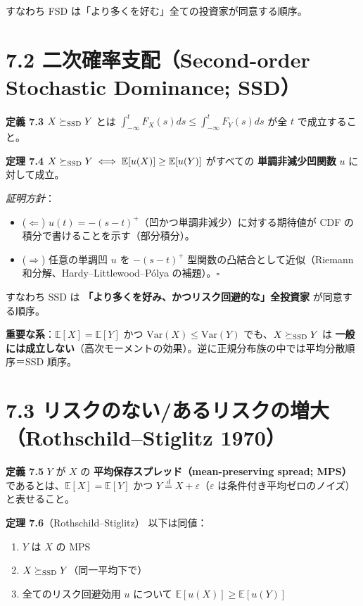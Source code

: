 \documentclass[11pt,a4paper]{report}
\begin{document}
すなわち FSD は「より多くを好む」全ての投資家が同意する順序。

\section{7.2 二次確率支配（Second-order Stochastic Dominance; SSD）}

\textbf{定義 7.3} $X \succeq_{\rm SSD} Y$ とは $\int_{-\infty}^t F_X(s) ds \le \int_{-\infty}^t F_Y(s) ds$ が全 $t$ で成立すること。

\textbf{定理 7.4} $X \succeq_{\rm SSD} Y \iff \mathbb{E}[u(X)] \ge \mathbb{E}[u(Y)]$ がすべての \textbf{単調非減少凹関数} $u$ に対して成立。

\emph{証明方針}：
\begin{itemize}
\item ($\Leftarrow$) $u(t) = -(s - t)^+$（凹かつ単調非減少）に対する期待値が CDF の積分で書けることを示す（部分積分）。
\item ($\Rightarrow$) 任意の単調凹 $u$ を $-(s-t)^+$ 型関数の凸結合として近似（Riemann 和分解、Hardy–Littlewood–Pólya の補題）。$\square$
\end{itemize}

すなわち SSD は \textbf{「より多くを好み、かつリスク回避的な」全投資家} が同意する順序。

\textbf{重要な系}：$\mathbb{E}[X] = \mathbb{E}[Y]$ かつ $\mathrm{Var}(X) \le \mathrm{Var}(Y)$ でも、$X \succeq_{\rm SSD} Y$ は \textbf{一般には成立しない}（高次モーメントの効果）。逆に正規分布族の中では平均分散順序＝SSD 順序。

\section{7.3 リスクのない/あるリスクの増大（Rothschild–Stiglitz 1970）}

\textbf{定義 7.5} $Y$ が $X$ の \textbf{平均保存スプレッド（mean-preserving spread; MPS）} であるとは、$\mathbb{E}[X] = \mathbb{E}[Y]$ かつ $Y \stackrel{d}{=} X + \varepsilon$（$\varepsilon$ は条件付き平均ゼロのノイズ）と表せること。

\textbf{定理 7.6}（Rothschild–Stiglitz） 以下は同値：
\begin{enumerate}
\item $Y$ は $X$ の MPS
\item $X \succeq_{\rm SSD} Y$（同一平均下で）
\item 全てのリスク回避効用 $u$ について $\mathbb{E}[u(X)] \ge \mathbb{E}[u(Y)]$
\end{enumerate}
\end{document}
